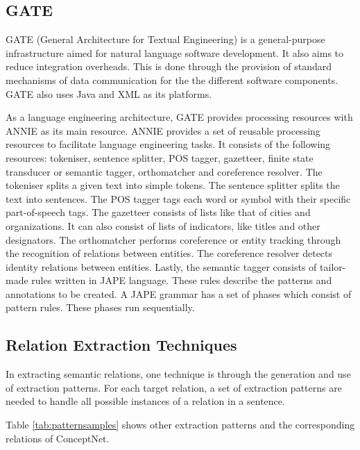 \subsection{GATE}
\label{sec:gate}

GATE (General Architecture for Textual Engineering) is a general-purpose infrastructure aimed for natural language software development. It also aims to reduce integration overheads. This is done through the provision of standard mechanisms of data communication for the the different software components. GATE also uses Java and XML as its platforms. 

As a language engineering architecture, GATE provides processing resources with ANNIE as its main resource. ANNIE provides a set of reusable processing resources to facilitate language engineering tasks. It consists of the following resources: tokeniser, sentence splitter, POS tagger, gazetteer, finite state transducer or semantic tagger, orthomatcher and coreference resolver. The tokeniser splits a given text into simple tokens. The sentence splitter splits the text into sentences. The POS tagger tags each word or symbol with their specific part-of-speech tags. The gazetteer consists of lists like that of cities and organizations. It can also consist of lists of indicators, like titles and other designators. The orthomatcher performs coreference or entity tracking through the recognition of relations between entities. The coreference resolver detects identity relations between entities. Lastly, the semantic tagger consists of tailor-made rules written in JAPE language. These rules describe the patterns and annotations to be created. A JAPE grammar has a set of phases which consist of pattern rules. These phases run sequentially. 

\subsection{Relation Extraction Techniques}
\label{sec:relextraction}

In extracting semantic relations, one technique is through the generation and use of extraction patterns. For each target relation, a set of extraction patterns are needed to handle all possible instances of a relation in a sentence.

Table \ref{tab:patternsamples} shows other extraction patterns and the corresponding relations of ConceptNet.

